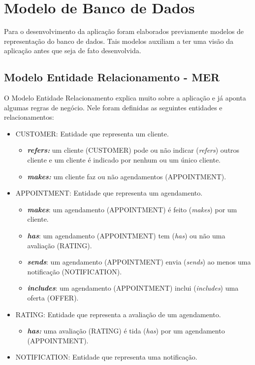 \section{Modelo de Banco de Dados}
Para o desenvolvimento da aplicação foram elaborados previamente modelos de representação do banco de dados. Tais modelos auxiliam a ter uma visão da aplicação antes que seja de fato desenvolvida.
\subsection{Modelo Entidade Relacionamento - MER}
O Modelo Entidade Relacionamento explica muito sobre a aplicação e já aponta algumas regras de negócio.
Nele foram definidas as seguintes entidades e relacionamentos:
\begin{itemize}
	\item CUSTOMER: Entidade que representa um cliente.
	\begin{itemize}
		\item \textbf{\textit{refers:}} um cliente (CUSTOMER) pode ou não indicar (\textit{refers}) outros cliente e um cliente é indicado por nenhum ou um único cliente.
		\item \textbf{\textit{makes:}} um cliente faz ou não agendamentos (APPOINTMENT).
	\end{itemize}
	\item APPOINTMENT: Entidade que representa um agendamento.
	\begin{itemize}
		\item \textbf{\textit{makes}}: um agendamento (APPOINTMENT) é feito (\textit{makes}) por um cliente. 
		\item \textbf{\textit{has}}: um agendamento (APPOINTMENT) tem (\textit{has}) ou não uma avaliação (RATING).
		\item \textbf{\textit{sends}}: um agendamento (APPOINTMENT) envia (\textit{sends}) ao menos uma notificação (NOTIFICATION).
		\item \textbf{\textit{includes}}: um agendamento (APPOINTMENT) inclui (\textit{includes}) uma oferta (OFFER).
	\end{itemize}
	\item RATING: Entidade que representa a avaliação de um agendamento.
	\begin{itemize}
		\item \textbf{\textit{has:}} uma avaliação (RATING) é tida (\textit{has}) por um agendamento (APPOINTMENT).
	\end{itemize}
	\item NOTIFICATION: Entidade que representa uma notificação.

\end{itemize}
